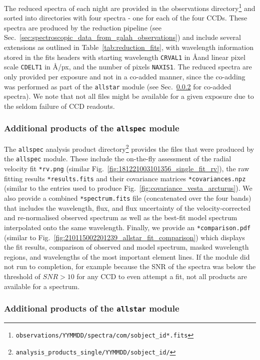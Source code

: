 \documentclass[
  journal=pasa,
  manuscript=research-paper, %
  year=2024,
  volume=37
]{cup-journal}
\begin{document}
The reduced spectra of each night are provided in the observations directory\footnote{\texttt{observations/YYMMDD/spectra/com/sobject\_id*.fits}} and sorted into directories with four spectra - one for each of the four CCDs. These spectra are produced by the reduction pipeline (see Sec.~\ref{sec:spectroscopic_data_from_galah_observations}) and include several extensions as outlined in Table~\ref{tab:reduction_fits}, with wavelength information stored in the fits headers with starting wavelength \texttt{CRVAL1} in \AA and linear pixel scale \texttt{CDELT1} in \AA/px, and the number of pixels \texttt{NAXIS1}. The reduced spectra are only provided per exposure and not in a co-added manner, since the co-adding was performed as part of the \texttt{allstar} module (see Sec.~\ref{sec:products_allstar} for co-added spectra). We note that not all files might be available for a given exposure due to the seldom failure of CCD readouts.

\subsubsection{Additional products of the \texttt{allspec} module} \label{sec:products_allspec}

The \texttt{allspec} analysis product directory\footnote{\texttt{analysis\_products\_single/YYMMDD/sobject\_id/}} provides the files that were produced by the \texttt{allspec} module. These include the on-the-fly assessment of the radial velocity fit \texttt{*rv.png} (similar Fig.~\ref{fig:181221003101356_single_fit_rv}), the raw fitting results \texttt{*results.fits} and their covariance matrices \texttt{*covariances.npz} (similar to the entries used to produce Fig.~\ref{fig:covariance_vesta_arcturus}). We also provide a combined \texttt{*spectrum.fits} file (concatenated over the four bands) that includes the wavelength, flux, and flux uncertainty of the velocity-corrected and re-normalised observed spectrum as well as the best-fit model spectrum interpolated onto the same wavelength. Finally, we provide an \texttt{*comparison.pdf} (similar to Fig.~\ref{fig:210115002201239_allstar_fit_comparison}) which displays the fit results, comparison of observed and model spectrum, masked wavelength regions, and wavelengths of the most important element lines. If the module did not run to completion, for example because the SNR of the spectra was below the threshold of $SNR > 10$ for any CCD to even attempt a fit, not all products are available for a spectrum.

\subsubsection{Additional products of the \texttt{allstar} module} \label{sec:products_allstar}
\end{document}
